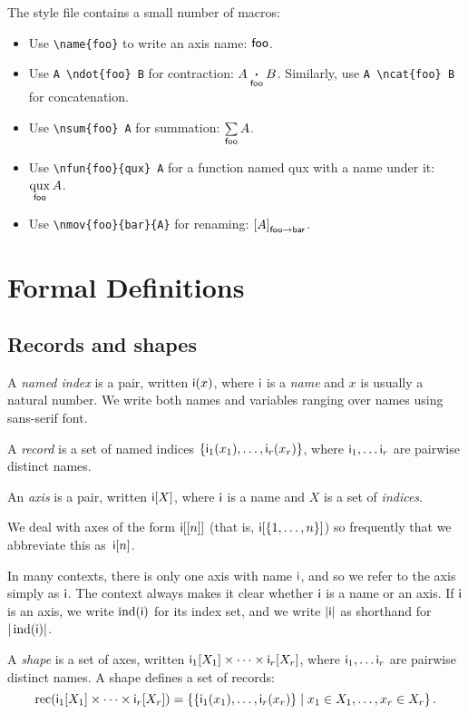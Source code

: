\documentclass{article}
\DeclareMathOperator{\ind}{ind}
\DeclareMathOperator{\rec}{rec}
\begin{document}
The style file contains a small number of macros:
\begin{itemize}
\item Use \verb|\name{foo}| to write an axis name: $\name{foo}$.
\item Use \verb|A \ndot{foo} B| for contraction: $A \ndot{foo} B$. Similarly, use \verb|A \ncat{foo} B| for concatenation.
\item Use \verb|\nsum{foo} A| for summation: $\nsum{foo} A$.
\item Use \verb|\nfun{foo}{qux} A| for a function named qux with a name under it: $\nfun{foo}{qux} A$.
\item Use \verb|\nmov{foo}{bar}{A}| for renaming: $\nmov{foo}{bar}{A}$.
\end{itemize}

\section{Formal Definitions}
\label{sec:definitions}

\newcommand{\sub}[1]{_\text{$#1$}}

\subsection{Records and shapes}

A \emph{named index} is a pair, written $\nidx{i}{x}$, where $\name{i}$ is a \emph{name} and $x$ is usually a natural number. We write both names and variables ranging over names using sans-serif font.

A \emph{record} is a set of named indices $\{\nidx{i\sub{1}}{x_1}, \ldots, \nidx{i\sub{r}}{x_r}\}$, where $\name{i\sub{1}}, \ldots \name{i\sub{r}}$ are pairwise distinct names. 

An \emph{axis} is a pair, written $\nset{i}{X}$, where $\name{i}$ is a name and $X$ is a set of \emph{indices}.

We deal with axes of the form $\nset{i}{[n]}$ (that is, $\nset{i}{\{1, \ldots, n\}}$) so frequently that we abbreviate this as~$\nset{i}{n}$.

In many contexts, there is only one axis with name $\name{i}$, and so we refer to the axis simply as $\name{i}$. The context always makes it clear whether $\name{i}$ is a name or an axis. If $\name{i}$ is an axis, we write $\ind(\name{i})$ for its index set, and we write $|\name{i}|$ as shorthand for~$|\ind(\name{i})|$.

A \emph{shape} is a set of axes, written $\nset{i\sub{1}}{X_1} \times \cdots \times \nset{i\sub{r}}{X_r}$, where $\name{i\sub{1}}, \ldots \name{i\sub{r}}$ are pairwise distinct names. A shape defines a set of records:
\begin{equation*}
\rec (\nset{i\sub{1}}{X_1} \times \cdots \times \nset{i\sub{r}}{X_r}) = \left\{\{\nidx{i\sub{1}}{x_1}, \ldots, \nidx{i\sub{r}}{x_r}\} \mid x_1 \in X_1, \ldots, x_r \in X_r\right\}.
\end{equation*}
\end{document}

